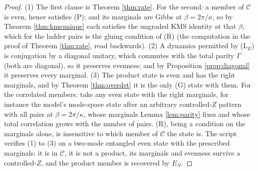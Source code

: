 \documentclass[11pt]{article}
\theoremstyle{definition}
\newcommand{\EN}{E_{N}}
\begin{document}
\begin{proof}
(1) The first clause is Theorem \ref{thm:rate}. For the second: a member of $\mathcal{C}$ is even, hence satisfies (P); and its marginals are Gibbs at $\beta = 2\pi/\kappa$, so by Theorem \ref{thm:kmsunique} each satisfies the ungraded KMS identity at that $\beta$, which for the ladder pairs is the gluing condition of (R) (the computation in the proof of Theorem \ref{thm:rate}, read backwards). (2) A dynamics permitted by (L$_E$) is conjugation by a diagonal unitary, which commutes with the total parity $\Gamma$ (both are diagonal), so it preserves evenness; and by Proposition \ref{prop:diagonal} it preserves every marginal. (3) The product state is even and has the right marginals, and by Theorem \ref{thm:overdet} it is the only (G) state with them. For the correlated members: take any even state with the right marginals, for instance the model's mode-space state after an arbitrary controlled-$Z$ pattern with all pairs at $\beta = 2\pi/\kappa$, whose marginals Lemma \ref{lem:parity} fixes and whose total correlation grows with the number of pairs. (R), being a condition on the marginals alone, is insensitive to which member of $\mathcal{C}$ the state is. The script verifies (1) to (3) on a two-mode entangled even state with the prescribed marginals: it is in $\mathcal{C}$, it is not a product, its marginals and evenness survive a controlled-$Z$, and the product member is recovered by $\EN$.
\end{proof}
\end{document}
